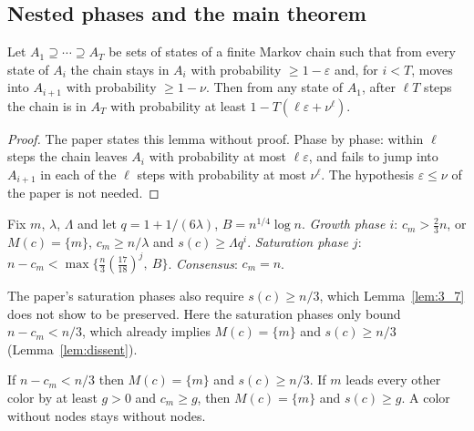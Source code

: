 \subsection{Nested phases and the main theorem}

\begin{lemma}\label{lem:A_4}
  \leanok
  Let $A_1 \supseteq \cdots \supseteq A_T$ be sets of states of a finite
  Markov chain such that from every state of $A_i$ the chain stays in $A_i$
  with probability $\ge 1-\varepsilon$ and, for $i < T$, moves into
  $A_{i+1}$ with probability $\ge 1 - \nu$. Then from any state of $A_1$,
  after $\ell T$ steps the chain is in $A_T$ with probability at least
  $1 - T(\ell\varepsilon + \nu^\ell)$.
\end{lemma}

\begin{proof}
  The paper states this lemma without proof. Phase by phase: within $\ell$ steps the chain
  leaves $A_i$ with probability at most $\ell\varepsilon$, and fails to jump
  into $A_{i+1}$ in each of the $\ell$ steps with probability at most
  $\nu^\ell$. The hypothesis $\varepsilon \le \nu$ of the paper is not needed.
\end{proof}

\begin{definition}\label{def:phases}
  \leanok
  Fix $m$, $\lambda$, $\Lambda$ and let $q = 1 + 1/(6\lambda)$,
  $B = n^{1/4}\log n$.
  \emph{Growth phase $i$}: $c_m > \frac23 n$, or $M(c) = \{m\}$,
  $c_m \ge n/\lambda$ and $s(c) \ge \Lambda q^i$.
  \emph{Saturation phase $j$}:
  $n - c_m < \max\{\frac n3 (\frac{17}{18})^j,\ B\}$.
  \emph{Consensus}: $c_m = n$.
\end{definition}

\begin{remark}
  The paper's saturation phases also require $s(c) \ge n/3$, which
  Lemma~\ref{lem:3_7} does not show to be preserved. Here the saturation
  phases only bound $n - c_m < n/3$, which already implies $M(c) = \{m\}$
  and $s(c) \ge n/3$ (Lemma~\ref{lem:dissent}).
\end{remark}

\begin{lemma}\label{lem:dissent}
  \leanok
  If $n - c_m < n/3$ then $M(c) = \{m\}$ and $s(c) \ge n/3$. If $m$ leads
  every other color by at least $g > 0$ and $c_m \ge g$, then $M(c) = \{m\}$
  and $s(c) \ge g$. A color without nodes stays without nodes.
\end{lemma}

